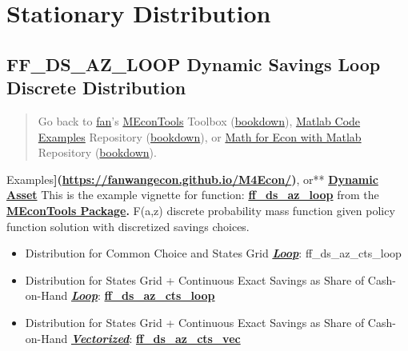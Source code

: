 \documentclass[
]{book}
\begin{document}
\hypertarget{stationary-distribution}{%
\chapter{Stationary Distribution}\label{stationary-distribution}}

\hypertarget{ff_ds_az_loop-dynamic-savings-loop-discrete-distribution}{%
\section{FF\_DS\_AZ\_LOOP Dynamic Savings Loop Discrete Distribution}\label{ff_ds_az_loop-dynamic-savings-loop-discrete-distribution}}

\begin{quote}
Go back to \href{http://fanwangecon.github.io/}{fan}'s \href{https://fanwangecon.github.io/MEconTools/}{MEconTools} Toolbox (\href{https://fanwangecon.github.io/MEconTools/bookdown}{bookdown}), \href{https://fanwangecon.github.io/M4Econ/}{Matlab Code Examples} Repository (\href{https://fanwangecon.github.io/M4Econ/bookdown}{bookdown}), or \href{https://fanwangecon.github.io/Math4Econ/}{Math for Econ with Matlab} Repository (\href{https://fanwangecon.github.io/Math4Econ/bookdown}{bookdown}).
\end{quote}

Examples\textbf{{]}(\url{https://fanwangecon.github.io/M4Econ/})}, or** \href{https://fanwangecon.github.io/CodeDynaAsset/}{\textbf{Dynamic
Asset}}
This is the example vignette for function:
\href{https://github.com/FanWangEcon/MEconTools/blob/master/MEconTools/vfi/ff_ds_az_loop.m}{\textbf{ff\_ds\_az\_loop}}
from the \href{https://fanwangecon.github.io/MEconTools/}{\textbf{MEconTools
Package}}\textbf{.} F(a,z)
discrete probability mass function given policy function solution with
discretized savings choices.

\begin{itemize}
\item
  Distribution for Common Choice and States Grid \underline{\textbf{\emph{Loop}}}:
  ff\_ds\_az\_cts\_loop
\item
  Distribution for States Grid + Continuous Exact Savings as Share of
  Cash-on-Hand \underline{\textbf{\emph{Loop}}}:
  \href{https://github.com/FanWangEcon/MEconTools/blob/master/MEconTools/vfi/ff_ds_az_cts_loop.m}{\textbf{ff\_ds\_az\_cts\_loop}}
\item
  Distribution for States Grid + Continuous Exact Savings as Share of
  Cash-on-Hand \underline{\textbf{\emph{Vectorized}}}:
  \href{https://github.com/FanWangEcon/MEconTools/blob/master/MEconTools/vfi/ff_ds_az_cts_vec.m}{\textbf{ff\_ds\_az\_cts\_vec}}
\end{itemize}
\end{document}
